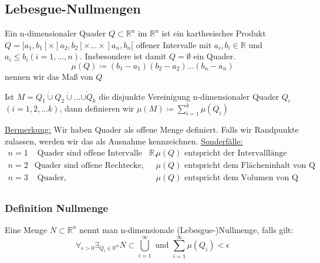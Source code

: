 \subsection{Lebesgue-Nullmengen}
Ein n-dimensionaler Quader $Q \subset \mathbb{R}^n$ im $\mathbb{R}^n$ ist ein karthesisches Produkt $Q = ]a_1,b_1[ \times ]a_2,b_2[ \times ... \times ]a_n,b_n[$ offener Intervalle mit $a_i,b_i \in \mathbb{R}$ und $a_i \leq b_i (i=1,...,n)$. Insbesondere ist damit $Q = \emptyset$ ein Quader.
\[ \mu(Q)\coloneqq (b_1 - a_1)(b_2 - a_2)...(b_n - a_n)\] nennen wir das Maß von $Q$

Ist $M = Q_1 \dot\cup Q_2 \dot{\cup} ... \dot{\cup Q_k}$ die disjunkte Vereinigung n-dimensionaler Quader $Q_i$ $(i=1,2,...k)$, dann definieren wir $\mu(M)\coloneqq \sum_{i=1}^{k} \mu(Q_i)$

\underline{Bermerkung:}
Wir haben Quader als offene Menge definiert. Falls wir Randpunkte zulassen, werden wir das als Ausnahme kennzeichnen.
\underline{Sonderfälle:}
\begin{equation*}
	\begin{matrix}
		n=1 &\text{ Quader sind offene Intervalle des } \mathbb{R}, & \mu(Q) \text{ entspricht der Intervalllänge}\\
		n=2 & \text{Quader sind offene Rechtecke, } & \mu(Q) \text{ entspricht dem Flächeninhalt von Q}\\
		n=3 &\text{ Quader, } & \mu(Q) \text{ entspricht dem Volumen von Q}\\
	\end{matrix}
\end{equation*}
\subsubsection{Definition Nullmenge}
Eine Menge $N \subset \mathbb{R}^n$ nennt man n-dimensionale (Lebesgue-)Nullmenge, falls gilt:
\[\forall_{\epsilon > 0} \exists_{Q_i \in \mathbb{R}^n} N \subset \bigcup_{i =1}^{\infty} \text{ und } \sum_{i=1}^{\infty} \mu(Q_i) < \epsilon\]

